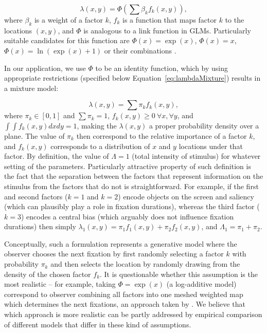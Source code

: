 \documentclass{article}
\begin{document}
\begin{equation}
    \lambda(x, y) = \Phi \left(\sum \beta_k f_k(x, y) \right),
\end{equation}
where $\beta_k$ is a weight of a factor $k$, $f_k$ is a function that maps factor $k$ to the locations $(x, y)$, and $\Phi$ is analogous to a link function in GLMs. Particularly suitable candidates for this function are $\Phi (x) = \exp(x)$, $\Phi (x) = x$, $\Phi (x) = \ln(\exp(x) + 1)$ or their combinations \citep[see ][for the discussion of the differences between them]{barthelme2013spatial}. 

In our application, we use $\Phi$ to be an identity function, which by using appropriate restrictions (specified below Equation~\ref{eq:lambdaMixture}) results in a mixture model:

\begin{equation}
\label{eq:lambdaMixture}
    \lambda(x, y) = \sum \pi_k f_k(x, y),
\end{equation}
where $\pi_k \in [0, 1]$ and $\sum \pi_k = 1$, $f_k(x, y) \geq 0~\forall x, \forall y$, and $\int \int f_k(x, y) dx dy = 1$, making the $\lambda(x, y)$ a proper probability density over a plane. The value of $\pi_k$ then correspond to the relative importance of a factor $k$, and $f_k(x, y)$ corresponds to a distribution of $x$ and $y$ locations under that factor. By definition, the value of $\Lambda = 1$ (total intensity of stimulus) for whatever setting of the parameters. Particularly attractive property of such definition is the fact that the separation between the factors that represent information on the stimulus from the factors that do not is straightforward. For example, if the first and second factors ($k=1$ and $k=2$) encode objects on the screen and saliency (which can plausibly play a role in fixation durations), whereas the third factor ($k=3$) encodes a central bias (which arguably does not influence fixation durations) then simply $\lambda_1(x, y) = \pi_1 f_1(x, y) + \pi_2 f_2(x, y)$, and $\Lambda_1 = \pi_1 + \pi_2$.

Conceptually, such a formulation represents a generative model where the observer chooses the next fixation by first randomly selecting a factor $k$ with probability $\pi_k$ and then selects the location by randomly drawing from the density of the chosen factor $f_k$. It is questionable whether this assumption is the most realistic -- for example, taking $\Phi = \exp(x)$ (a log-additive model) correspond to observer combining all factors into one meshed weighted map which determines the next fixations, an approach taken by \citet{barthelme2013spatial}. We believe that which approach is more realistic can be partly addressed by empirical comparison of different models that differ in these kind of assumptions.
\end{document}
